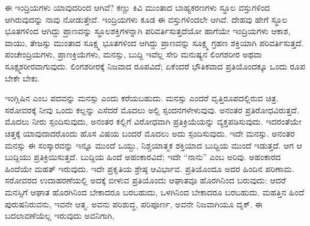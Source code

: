 ಈ ಇಂದ್ರಿಯಗಳು ಯಾವುದರಿಂದ ಆಗಿವೆ? ಕಣ್ಣು ಕಿವಿ ಮುಂತಾದ ಬಾಹ್ಯ\break ಕರಣಗಳು ಸ್ಥೂಲ ವಸ್ತುಗಳಿಂದ ಆಗಿರುವುದನ್ನು ನಾವು ನೋಡುತ್ತೇವೆ. ಇಂದ್ರಿಯಗಳು ಕೂಡ ಈ ವಸ್ತುಗಳಿಂದಲೇ ಆಗಿವೆ. ದೇಹವು ಹೇಗೆ ಸ್ಥೂಲ ಭೂತಗಳಿಂದ ಆಗಿದ್ದು ಪ್ರಾಣವನ್ನು ಸ್ಥೂಲಶಕ್ತಿಗಳನ್ನಾಗಿ ಪರಿವರ್ತಿಸುತ್ತದೆಯೋ ಹಾಗೆಯೇ ಇಂದ್ರಿಯಗಳು ಆಕಾಶ, ವಾಯು, ತೇಜಸ್ಸು ಮುಂತಾದ ಸೂಕ್ಷ್ಮ ಭೂತಗಳಿಂದ ಆಗಿದ್ದು ಪ್ರಾಣವನ್ನು ಸೂಕ್ಷ್ಮ ಗ್ರಹಣ ಶಕ್ತಿಯಾಗಿ ಪರಿವರ್ತಿಸುತ್ತದೆ. ಪಂಚೇಂದ್ರಿಯಗಳು, ಪ್ರಾಣಕ್ರಿಯೆಗಳು, ಮನಸ್ಸು, ಬುದ್ದಿ ಇವೆಲ್ಲ ಸೇರಿ ಮನುಷ್ಯನ ಲಿಂಗಶರೀರ ಅಥವಾ ಸೂಕ್ಷ್ಮಶರೀರವಾಗುವುದು. ಲಿಂಗಶರೀರಕ್ಕೆ ನಿಜವಾದ ರೂಪವಿದೆ; ಏಕೆಂದರೆ ಭೌತಿಕವಾದ ಪ್ರತಿಯೊಂದಕ್ಕೂ ಒಂದು ರೂಪ ಬೇಕೇ ಬೇಕು.

\vskip 5pt

ಇಂಗ್ಲಿಷಿನ  ಎಂಬ ಪದವನ್ನು ಮನಸ್ಸು ಎಂದು ಕರೆಯಬಹುದು. ಮನಸ್ಸು ಎಂದರೆ ವೃತ್ತಿರೂಪದಲ್ಲಿರುವ ಚಿತ್ರ. ಸರೋವರಕ್ಕೆ ನೀವು ಒಂದು ಕಲ್ಲನ್ನು ಎಸೆದರೆ ಮೊದಲು ಅಲ್ಲಿ ಸ್ಪಂದನಗಳೇಳುವುವು. ಅನಂತರ ಪ್ರತಿರೋಧವಿರುತ್ತದೆ. ಮೊದಲು ನೀರು ಸ್ಪಂದಿಸುವುದು, ಅನಂತರ ಕಲ್ಲಿಗೆ ವಿರೋಧವಾಗಿ ಪ್ರತಿಕ್ರಿಯೆಯನ್ನು ವ್ಯಕ್ತಪಡಿಸುವುದು. ಇದರಂತೆಯೇ ಚಿತ್ತಕ್ಕೆ ಯಾವುದಾದರೊಂದು ಹೊಸ ವಿಷಯ ಬಂದರೆ ಮೊದಲು ಅದು ಸ್ಪಂದಿಸುವುದು. ಇದೇ ಮನಸ್ಸು. ಅನಂತರ ಮನಸ್ಸು ಈ ಸಂಸ್ಕಾರವನ್ನು ಇನ್ನೂ ಮುಂದೆ ಒಯ್ದು, ನಿಶ್ಚಯಾತ್ಮಕ ಶಕ್ತಿಯಾದ ಬುದ್ದಿಯ ಮುಂದೆ ಇಡುತ್ತದೆ. ಆಗ ಆ ಬುದ್ದಿಯು ಪ್ರತಿಕ್ರಿಯಿಸುತ್ತದೆ. ಬುದ್ದಿಯ ಹಿಂದೆ ಅಹಂಕಾರವಿದೆ; ಇದೇ “ನಾನು'' ಎಂಬ ಅರಿವು. ಅಹಂಕಾರದ ಹಿಂದೆಯೇ ಮಹತ್ ಇರುವುದು. ಇದೇ ಪ್ರಕೃತಿಯ ಶ್ರೇಷ್ಠ ಆವಿರ್ಭಾವ. ಪ್ರತಿಯೊಂದೂ ಅದರ ಹಿಂದಿನ ಪರಿಣಾಮ. ಸರೋವರದ ಉದಾಹರಣೆಯಲ್ಲಿ ಅದಕ್ಕೆ ಬೀಳುವ ಪ್ರತಿಯೊಂದು ಆಘಾತವೂ ಹೊರಗಿನಿಂದ ಬರುವುದು: ಆದರೆ ಮನಸ್ಸಿಗೆ ಆಘಾತ ಹೊರಗಿನಿಂದ ಬೇಕಾದರೂ ಬರಬಹುದು, ಒಳಗಿನಿಂದ ಬೇಕಾದರೂ ಬರಬಹುದು. ಮಹತ್ತಿನ ಹಿಂದೆ ಪುರುಷನಿರುವನು, ಇವನೇ ಆತ್ಮ. ಅವನು ಪರಿಶುದ್ಧ, ಪರಿಪೂರ್ಣ, ಅವನೇ ನಿಜವಾಗಿಯೂ ದೃಕ್. ಈ ಬದಲಾವಣೆಯೆಲ್ಲ ಇರುವುದು ಅವನಿಗಾಗಿ,

\vskip 5pt

